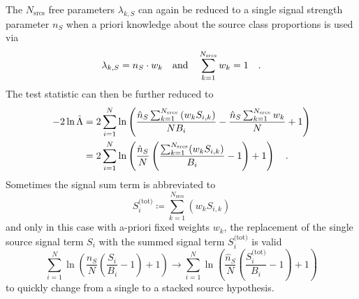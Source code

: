 The $N_\text{srcs}$ free parameters $\lambda_{k,S}$ can again be reduced to a single signal strength parameter $n_S$ when a priori knowledge about the source class proportions is used via
\begin{equation}
  \lambda_{k,S} = n_S \cdot w_k
  \quad\text{and}\quad
  \sum_{k=1}^{N_\text{srcs}} w_k = 1
  \quad\text{.}
\end{equation}
The test statistic can then be further reduced to
\begin{align}
  -2\ln\hat{\Lambda}
  &= 2\sum_{i=1}^N \ln\left(
        \frac{\hat{n}_S \sum_{k=1}^{N_\text{srcs}}\left(w_k S_{i,k}\right)}
             {N B_i} -
        \frac{\hat{n}_S \sum_{k=1}^{N_\text{srcs}}w_k}{N} + 1
      \right) \\
  &= 2\sum_{i=1}^N \ln\left(
        \frac{\hat{n}_S}{N}\left(
          \frac{\sum_{k=1}^{N_\text{srcs}}(w_k S_{i,k})}{B_i} - 1
        \right) + 1
      \right)
  \quad\text{.}
\end{align}
Sometimes the signal sum term is abbreviated to
\begin{equation}
  S_i^\text{(tot)} \coloneqq \sum_{k=1}^{N_\text{srcs}}\left(w_k S_{i,k}\right)
\end{equation}
and only in this case with a-priori fixed weights $w_k$, the replacement of the single source signal term $S_i$ with the summed signal term $S_i^\text{(tot)}$ is valid
\begin{equation}
  \sum_{i=1}^N \ln\left(
      \frac{\hat{n}_S}{N}\left( \frac{S_i}{B_i} - 1 \right) + 1
    \right)
  \rightarrow
  \sum_{i=1}^N \ln\left(
      \frac{\hat{n}_S}{N}\left( \frac{S_i^\text{(tot)}}{B_i} - 1 \right) + 1
    \right)
\end{equation}
to quickly change from a single to a stacked source hypothesis.

